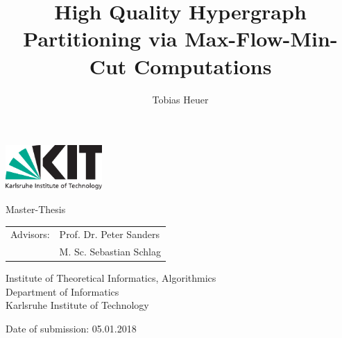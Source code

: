 \documentclass[12pt,a4paper,twoside, enabledeprecatedfontcommands]{scrartcl}
\numberwithin{equation}{section}
\begin{document}

\pagestyle{empty} %

\title{High Quality Hypergraph Partitioning via Max-Flow-Min-Cut Computations}
\author{Tobias Heuer}

\begin{titlepage}

  \begin{center}\large
 
    \quad\includegraphics[height=17mm]{../img/logo/kit_logo_en.pdf} \hfill

    \vfill

    Master-Thesis
    \vspace*{2cm}

    {\linespread{1.1}\huge\textbf{\thetitle}\par}

    \vfill

    \theauthor

    \vspace*{45mm}

    \begin{tabular}{rl}
      Advisors: & Prof. Dr. Peter Sanders \\
      & M. Sc. Sebastian Schlag\\
    \end{tabular}
    
    \vspace*{10mm}


    Institute of Theoretical Informatics, Algorithmics \\
    Department of Informatics \\
    Karlsruhe Institute of Technology

    \vspace*{15mm}

    Date of submission: 05.01.2018

    \vspace*{12mm}
  \end{center}

\end{titlepage}
\end{document}
